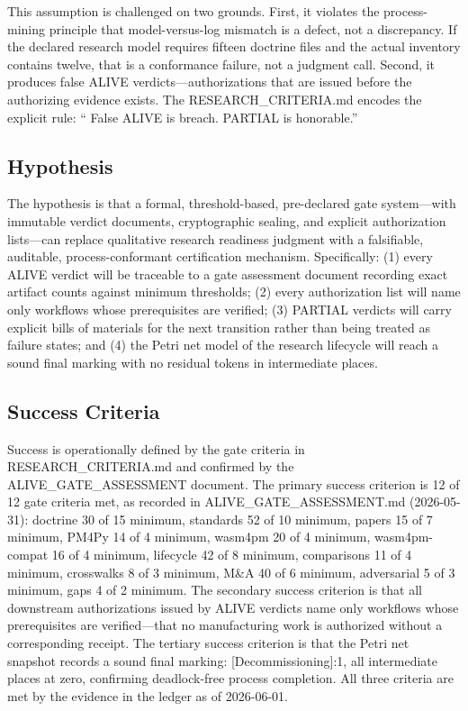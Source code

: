 This assumption is challenged on two grounds. First, it violates the process-mining principle that
model-versus-log mismatch is a defect, not a discrepancy. If the declared research model requires
fifteen doctrine files and the actual inventory contains twelve, that is a conformance failure, not a
judgment call. Second, it produces false ALIVE verdicts---authorizations that are issued before the
authorizing evidence exists. The RESEARCH\_CRITERIA.md encodes the explicit rule: \textquotedblleft
False ALIVE is breach. PARTIAL is honorable.\textquotedblright{}

\subsection{Hypothesis}
\label{sec:checkpoints-question-hypothesis}

The hypothesis is that a formal, threshold-based, pre-declared gate system---with immutable verdict
documents, cryptographic sealing, and explicit authorization lists---can replace qualitative
research readiness judgment with a falsifiable, auditable, process-conformant certification mechanism.
Specifically: (1) every ALIVE verdict will be traceable to a gate assessment document recording exact
artifact counts against minimum thresholds; (2) every authorization list will name only workflows
whose prerequisites are verified; (3) PARTIAL verdicts will carry explicit bills of materials for the
next transition rather than being treated as failure states; and (4) the Petri net model of the
research lifecycle will reach a sound final marking with no residual tokens in intermediate places.

\subsection{Success Criteria}
\label{sec:checkpoints-question-success}

Success is operationally defined by the gate criteria in RESEARCH\_CRITERIA.md and confirmed by the
ALIVE\_GATE\_ASSESSMENT document. The primary success criterion is 12 of 12 gate criteria met, as
recorded in ALIVE\_GATE\_ASSESSMENT.md (2026-05-31): doctrine 30 of 15 minimum, standards 52 of 10
minimum, papers 15 of 7 minimum, PM4Py 14 of 4 minimum, wasm4pm 20 of 4 minimum, wasm4pm-compat 16
of 4 minimum, lifecycle 42 of 8 minimum, comparisons 11 of 4 minimum, crosswalks 8 of 3 minimum,
M\&A 40 of 6 minimum, adversarial 5 of 3 minimum, gaps 4 of 2 minimum. The secondary success criterion
is that all downstream authorizations issued by ALIVE verdicts name only workflows whose
prerequisites are verified---that no manufacturing work is authorized without a corresponding receipt.
The tertiary success criterion is that the Petri net snapshot records a sound final marking:
[Decommissioning]:1, all intermediate places at zero, confirming deadlock-free process completion.
All three criteria are met by the evidence in the ledger as of 2026-06-01.
